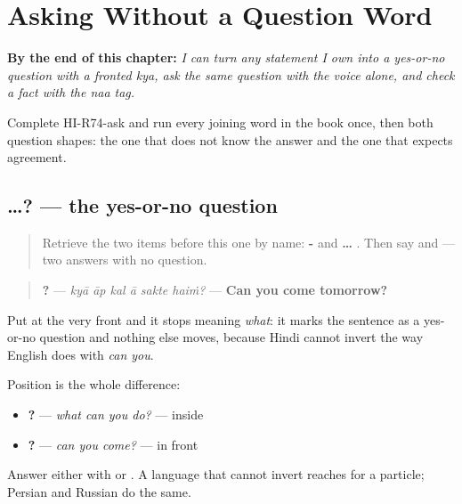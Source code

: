 
\chapter{Asking Without a Question Word}
\label{ch:hi-polar-question}

\begin{chapteropening}
\textbf{By the end of this chapter:} \emph{I can turn any statement I own into a yes-or-no question with a fronted kya, ask the same question with the voice alone, and check a fact with the naa tag.}

Complete HI-R74-ask and run every joining word in the book once, then both question shapes: the one that does not know the answer and the one that expects agreement.
\end{chapteropening}

\section[\texorpdfstring{\hi{क्या} …? (kyā …?)}{क्या …? (kyā …?)}]{ …? — the yes-or-no question}

\label{lesson:HI-C74-kya-polar}



\begin{quote}
Retrieve the two items before this one by name: \textbf{-} and \textbf{ … }. Then say \textbf{} and \textbf{} — two answers with no question.
\end{quote}

\begin{grammarlens}[title={Grammar Lens: \hi{क्या} at the FRONT means nothing}]
\begin{quote}
\textbf{     ?} — \emph{kyā āp kal ā sakte haiṁ?} — \textbf{Can you come tomorrow?}
\end{quote}

Put \textbf{} at the very front and it stops meaning \emph{what}: it marks the sentence as a yes-or-no question and nothing else moves, because Hindi cannot invert the way English does with \emph{can you}.

Position is the whole difference:

\begin{itemize}
\raggedright
  \item \textbf{    ?} — \emph{what can you do?} — inside
  \item \textbf{    ?} — \emph{can you come?} — in front
\end{itemize}

Answer either with \textbf{} or \textbf{}. A language that cannot invert reaches for a particle; Persian and Russian do the same.
\end{grammarlens}

